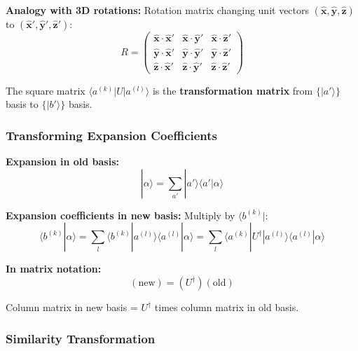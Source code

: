 \documentclass[11pt,a4paper]{article}
\begin{document}
\textbf{Analogy with 3D rotations:}
Rotation matrix changing unit vectors $(\hat{\mathbf{x}}, \hat{\mathbf{y}}, \hat{\mathbf{z}})$ to $(\hat{\mathbf{x}}', \hat{\mathbf{y}}', \hat{\mathbf{z}}')$:
\begin{equation}
R = \begin{pmatrix}
\hat{\mathbf{x}} \cdot \hat{\mathbf{x}}' & \hat{\mathbf{x}} \cdot \hat{\mathbf{y}}' & \hat{\mathbf{x}} \cdot \hat{\mathbf{z}}' \\
\hat{\mathbf{y}} \cdot \hat{\mathbf{x}}' & \hat{\mathbf{y}} \cdot \hat{\mathbf{y}}' & \hat{\mathbf{y}} \cdot \hat{\mathbf{z}}' \\
\hat{\mathbf{z}} \cdot \hat{\mathbf{x}}' & \hat{\mathbf{z}} \cdot \hat{\mathbf{y}}' & \hat{\mathbf{z}} \cdot \hat{\mathbf{z}}'
\end{pmatrix}
\tag{1.164}
\end{equation}

The square matrix $\langle a^{(k)}|U|a^{(l)}\rangle$ is the \textbf{transformation matrix} from $\{|a'\rangle\}$ basis to $\{|b'\rangle\}$ basis.

\subsubsection{Transforming Expansion Coefficients}

\textbf{Expansion in old basis:}
\begin{equation}
|\alpha\rangle = \sum_{a'}|a'\rangle\langle a'|\alpha\rangle
\tag{1.165}
\end{equation}

\textbf{Expansion coefficients in new basis:}
Multiply by $\langle b^{(k)}|$:
\begin{equation}
\langle b^{(k)}|\alpha\rangle = \sum_l \langle b^{(k)}|a^{(l)}\rangle\langle a^{(l)}|\alpha\rangle = \sum_l \langle a^{(k)}|U^\dagger|a^{(l)}\rangle\langle a^{(l)}|\alpha\rangle
\tag{1.166}
\end{equation}

\textbf{In matrix notation:}
\begin{equation}
\boxed{(\text{new}) = (U^\dagger)(\text{old})}
\tag{1.167}
\end{equation}

Column matrix in new basis = $U^\dagger$ times column matrix in old basis.

\subsubsection{Similarity Transformation}
\end{document}
